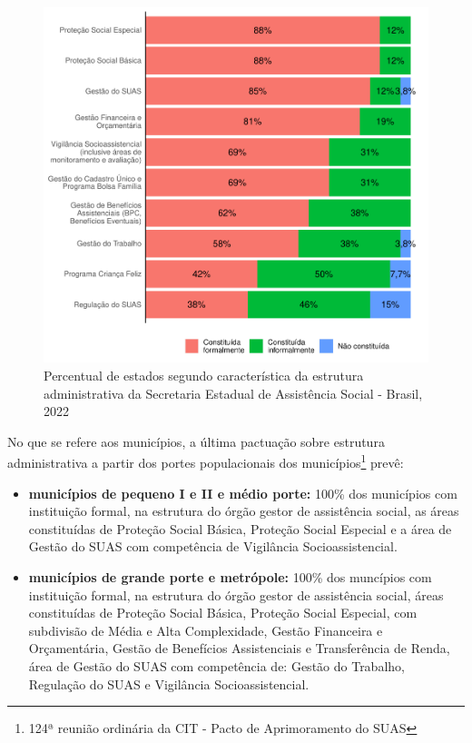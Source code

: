 \documentclass[
  brazilian]{report}
\begin{document}
\begin{figure}
\includegraphics{Censo-SUAS-2022_files/figure-latex/estados-constituicao-subdivisoes-1} \caption[Percentual de estados segundo característica da estrutura administrativa da Secretaria Estadual de Assistência Social - Brasil,  2022]{Percentual de estados segundo característica da estrutura administrativa da Secretaria Estadual de Assistência Social - Brasil,  2022}\label{fig:estados-constituicao-subdivisoes}
\end{figure}

No que se refere aos municípios, a última pactuação sobre estrutura
administrativa a partir dos portes populacionais dos
municípios\footnote{124ª reunião ordinária da CIT - Pacto de Aprimoramento do SUAS}
prevê:

\begin{itemize}
\item
  \textbf{municípios de pequeno I e II e médio porte:} 100\% dos
  municípios com instituição formal, na estrutura do órgão gestor de
  assistência social, as áreas constituídas de Proteção Social Básica,
  Proteção Social Especial e a área de Gestão do SUAS com competência de
  Vigilância Socioassistencial.
\item
  \textbf{municípios de grande porte e metrópole:} 100\% dos muncípios
  com instituição formal, na estrutura do órgão gestor de assistência
  social, áreas constituídas de Proteção Social Básica, Proteção Social
  Especial, com subdivisão de Média e Alta Complexidade, Gestão
  Financeira e Orçamentária, Gestão de Benefícios Assistenciais e
  Transferência de Renda, área de Gestão do SUAS com competência de:
  Gestão do Trabalho, Regulação do SUAS e Vigilância Socioassistencial.
\end{itemize}
\end{document}
